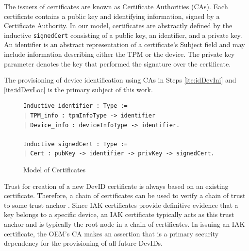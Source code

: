\documentclass[runningheads]{llncs}
\begin{document}
The issuers of certificates are known as Certificate Authorities
(CAs). Each certificate contains a public key and identifying
information, signed by a Certificate Authority. In our model,
certificates are abstractly defined by the inductive \verb|signedCert|
consisting of a public key, an identifier, and a private key. An
identifier is an abstract representation of a certificate's Subject
field and may include information describing either the TPM or the
device. The private key parameter denotes the key that performed the
signature over the certificate.

The provisioning of device identification using CAs in Steps
\ref{ite:idDevIni} and \ref{ite:idDevLoc} is the primary subject of
this work.

\begin{figure}[h]
\begin{lstlisting}[language=Coq]
Inductive identifier : Type :=
| TPM_info : tpmInfoType -> identifier
| Device_info : deviceInfoType -> identifier.

Inductive signedCert : Type :=
| Cert : pubKey -> identifier -> privKey -> signedCert.
\end{lstlisting}
\caption{Model of Certificates}
\end{figure}

Trust for creation of a new DevID certificate is always based on an
existing certificate. Therefore, a chain of certificates can be used
to verify a chain of trust to some trust anchor
\citep{DevIDSpec-TCG}. Since IAK certificates provide definitive
evidence that a key belongs to a specific device, an IAK certificate
typically acts as this trust anchor and is typically the root node in
a chain of certificates. In issuing an IAK certificate, the OEM's CA
makes an assertion that is a primary security dependency for the
provisioning of all future DevIDs.
\end{document}
